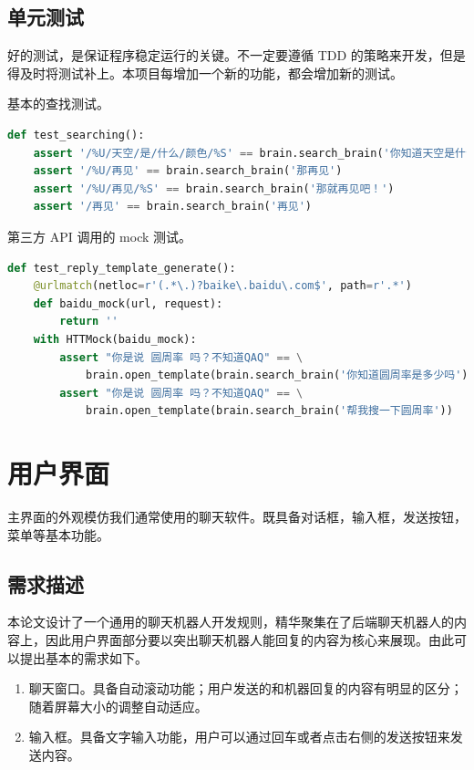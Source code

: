 \documentclass[bachelor,winfonts]{jnuthesis}
\begin{document}
\subsection{单元测试}

好的测试，是保证程序稳定运行的关键。不一定要遵循 TDD 的策略来开发，但是得及时将测试补上。本项目每增加一个新的功能，都会增加新的测试。

基本的查找测试。

\begin{lstlisting}[language=Python]
def test_searching():
    assert '/%U/天空/是/什么/颜色/%S' == brain.search_brain('你知道天空是什么颜色吗？')
    assert '/%U/再见' == brain.search_brain('那再见')
    assert '/%U/再见/%S' == brain.search_brain('那就再见吧！')
    assert '/再见' == brain.search_brain('再见')
\end{lstlisting}

第三方 API 调用的 mock 测试。

\begin{lstlisting}[language=Python]
def test_reply_template_generate():
    @urlmatch(netloc=r'(.*\.)?baike\.baidu\.com$', path=r'.*')
    def baidu_mock(url, request):
        return ''
    with HTTMock(baidu_mock):
        assert "你是说 圆周率 吗？不知道QAQ" == \
            brain.open_template(brain.search_brain('你知道圆周率是多少吗'))
        assert "你是说 圆周率 吗？不知道QAQ" == \
            brain.open_template(brain.search_brain('帮我搜一下圆周率'))
\end{lstlisting}

\section{用户界面}

主界面的外观模仿我们通常使用的聊天软件。既具备对话框，输入框，发送按钮，菜单等基本功能。

\subsection{需求描述}
本论文设计了一个通用的聊天机器人开发规则，精华聚集在了后端聊天机器人的内容上，因此用户界面部分要以突出聊天机器人能回复的内容为核心来展现。由此可以提出基本的需求如下。
\begin{enumerate}
\item 聊天窗口。具备自动滚动功能；用户发送的和机器回复的内容有明显的区分；随着屏幕大小的调整自动适应。
\item 输入框。具备文字输入功能，用户可以通过回车或者点击右侧的发送按钮来发送内容。
\end{enumerate}
\end{document}
